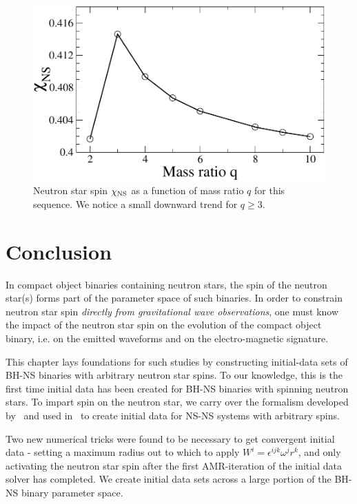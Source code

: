 \begin{figure}
\centerline{\includegraphics[scale=0.95]{chap4/qchi}}
\caption[$\chi_{\rm NS}$ as a function of mass ratio
$q$.]{\label{fig:qchi}Neutron star spin $\chi_{\rm
    NS}$ as a function of mass ratio $q$ for this sequence. We notice
  a small downward trend for $q \geq 3$.}
\end{figure}


\section{Conclusion}
\label{sec:Conc}


In compact object binaries containing neutron stars, the spin of the
neutron star(s) forms part of the parameter space of such binaries.
In order to constrain neutron star spin {\it directly from
  gravitational wave observations}, one must know the impact of the
neutron star spin on the evolution of the compact object binary,
i.e. on the emitted waveforms and on the electro-magnetic signature.

This chapter lays foundations for such studies by constructing
initial-data sets of BH-NS binaries with arbitrary neutron star spins.
To our knowledge, this is the first time initial data has been created
for BH-NS binaries with spinning neutron stars. To impart spin on the
neutron star, we carry over the formalism developed
by~\cite{Tichy:2011gw} and used
in~\cite{Bernuzzi:2013rza,Tacik:2015tja,Dietrich:2015pxa} to create
initial data for NS-NS systems with arbitrary spins.

Two new numerical tricks were found to be necessary to get convergent
initial data - setting a maximum radius out to which to apply
$W^i=\epsilon^{ijk}\omega^jr^k$, and only activating the neutron
star spin after the first AMR-iteration of the initial data solver has
completed. We create initial data sets across a large
portion of the BH-NS binary parameter space. 


